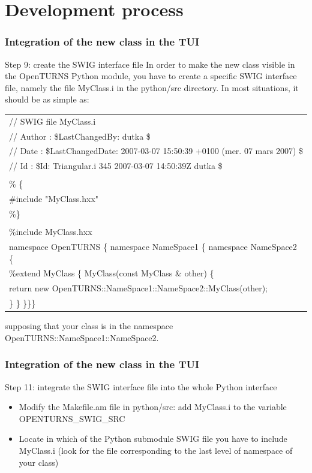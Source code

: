 \documentclass[8pt]{beamer}
\begin{document}
\section[Development process]{Development process}
\begin{frame}
  \frametitle{Integration of the new class in the TUI}
  \begin{block}{Step 9: create the SWIG interface file}
    In order to make the new class visible in the OpenTURNS Python module, you have to create a specific SWIG interface file, namely the file MyClass.i in the python/src directory. In most situations, it should be as simple as:
    \small
    \begin{tabular}{l}
      \ttfamily // SWIG file MyClass.i \\
      \ttfamily // Author : \$LastChangedBy: dutka \$ \\
      \ttfamily // Date : \$LastChangedDate: 2007-03-07 15:50:39 +0100 (mer. 07 mars 2007) \$ \\
      \ttfamily // Id : \$Id: Triangular.i 345 2007-03-07 14:50:39Z dutka \$ \\
      \ttfamily  \\
      \ttfamily \% \{ \\
      \ttfamily \#include "MyClass.hxx" \\
      \ttfamily \%\} \\
      \ttfamily  \\
      \ttfamily \%include MyClass.hxx \\
      \ttfamily namespace OpenTURNS \{ namespace NameSpace1 \{ namespace NameSpace2 \{ \\
      \ttfamily \%extend MyClass \{ MyClass(const MyClass \& other) \{ \\
      \ttfamily return new OpenTURNS::NameSpace1::NameSpace2::MyClass(other); \\
      \ttfamily \} \} \}\}\}
    \end{tabular}
    \normalsize
    supposing that your class is in the namespace {\ttfamily OpenTURNS::NameSpace1::NameSpace2}.
  \end{block}
\end{frame}
\begin{frame}
  \frametitle{Integration of the new class in the TUI}
  \begin{block}{Step 11: integrate the SWIG interface file into the whole Python interface}
    \begin{itemize}
    \item Modify the Makefile.am file in python/src: add MyClass.i to the variable OPENTURNS\_SWIG\_SRC
    \item Locate in which of the Python submodule SWIG file you have to include MyClass.i (look for the file corresponding to the last level of namespace of your class)
    \end{itemize}
  \end{block}
\end{frame}
\end{document}
